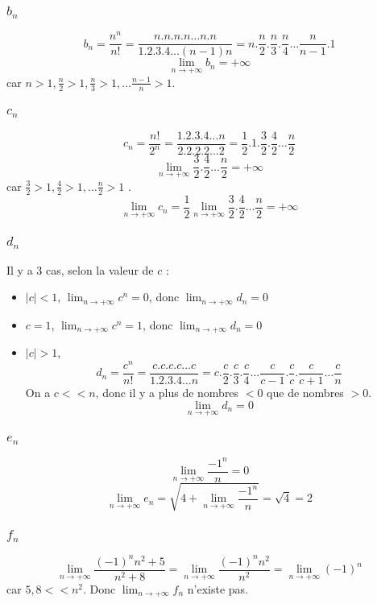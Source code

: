 \documentclass[]{book}
\theoremstyle{definition}
\begin{document}
\subsubsection*{$b_n$}
$$b_n = \frac{n^n}{n!} = \frac{n.n.n.n \ldots n.n}{1.2.3.4 \ldots (n-1)n} = n.\frac{n}{2}.\frac{n}{3}.\frac{n}{4} \ldots \frac{n}{n-1}.1$$
$$\lim_{n \to +\infty}{b_n} = +\infty$$
car $n>1, \frac{n}{2}>1, \frac{n}{3}>1,\ldots \frac{n-1}{n} >1$.

\subsubsection*{$c_n$}
$$c_n = \frac{n!}{2^n} = \frac{1.2.3.4 \ldots n}{2.2.2.2 \ldots 2} = \frac{1}{2}.1.\frac{3}{2}.\frac{4}{2} \ldots \frac{n}{2}$$
$$\lim_{n \to +\infty}\frac{3}{2}.\frac{4}{2} \ldots \frac{n}{2} = +\infty $$
car $\frac{3}{2}>1, \frac{4}{2}>1,\ldots \frac{n}{2} >1$ .
$$\lim_{n \to +\infty}{c_n} = \frac{1}{2}\lim_{n \to +\infty} \frac{3}{2}.\frac{4}{2} \ldots \frac{n}{2} = +\infty$$

\subsubsection*{$d_n$} 
Il y a 3 cas, selon la valeur de $c$ :
\begin{itemize}
\item $|c| < 1$, $\lim_{n \to +\infty}{c^n} =0$, donc $\lim_{n \to +\infty}{d_n} = 0$
\item $c = 1$, $\lim_{n \to +\infty}{c^n} = 1$, donc $\lim_{n \to +\infty}{d_n} = 0$ 
\item $|c| > 1$,  
$$d_n = \frac{c^n}{n!} = \frac{c.c.c.c \ldots c}{1.2.3.4 \ldots n} = c.\frac{c}{2}.\frac{c}{3}.\frac{c}{4} \ldots \frac{c}{c-1}.\frac{c}{c}.\frac{c}{c+1} \ldots \frac{c}{n}$$
On a $c << n$, donc il y a plus de nombres $<0$ que de nombres $>0$.
$$\lim_{n \to +\infty}{d_n} = 0$$
\end{itemize}

\subsubsection*{$e_n$}
$$\lim_{n \to +\infty}{\frac{-1^n}{n}} = 0$$ 
$$\lim_{n \to +\infty}{e_n} = \sqrt{4+\lim_{n \to +\infty}{\frac{-1^n}{n}}} = \sqrt{4} = 2$$

\subsubsection*{$f_n$}
$$\lim_{n \to +\infty}{\frac{(-1)^nn^2+5}{n^2+8}} = \lim_{n \to +\infty}{\frac{(-1)^nn^2}{n^2}} = \lim_{n \to +\infty}{(-1)^n}$$
car $5,8 << n^2$. Donc $\lim_{n \to +\infty}{f_n}$ n'existe pas.
\end{document}
